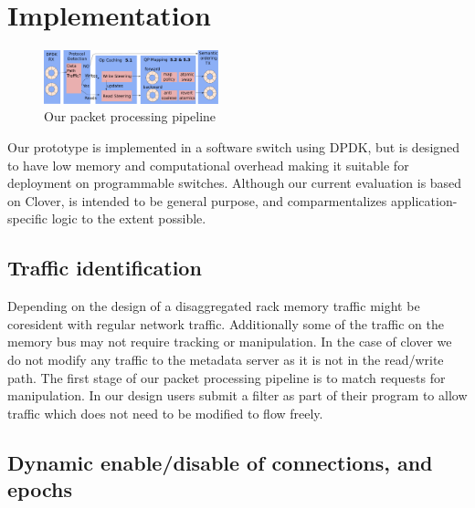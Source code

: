 \section{Implementation}

\begin{figure}
    \includegraphics[width=0.45\textwidth]{fig/packet_processing.pdf}
    \caption{Our packet processing pipeline}
    \label{fig:system}
\end{figure}

Our {\sword} prototype is implemented in a software switch using DPDK,
but is designed to have low memory and computational overhead making
it suitable for deployment on programmable switches.  Although our
current evaluation is based on Clover, {\sword} is intended to be
general purpose, and comparmentalizes application-specific
logic to the extent possible.



\subsection{Traffic identification} Depending on the design of a disaggregated
rack memory traffic might be coresident with regular network traffic.
Additionally some of the traffic on the memory bus may not require tracking or
manipulation. In the case of clover we do not modify any traffic to the metadata
server as it is not in the read/write path. The first stage of our packet
processing pipeline is to match requests for manipulation. In our design users
submit a filter as part of their program to allow traffic which does not need to
be modified to flow freely.

\subsection{Dynamic enable/disable of connections, and epochs}

